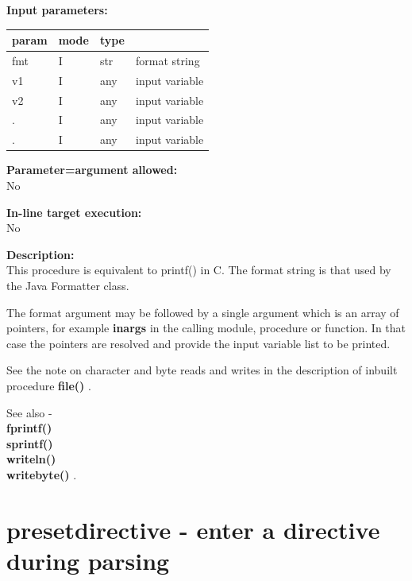         {\bf Input parameters:} \\
        \begin{tabular}{| l | l | l | l |}
        \hline
        param  & mode     & type  & \\
        \hline \hline
        fmt & I & str & format string   \\ \hline
        v1  & I & any & input variable  \\ \hline
        v2  & I & any & input variable  \\ \hline
        .   & I & any & input variable  \\ \hline
        .   & I & any & input variable  \\ \hline
        \end{tabular}
        
        {\bf Parameter=argument allowed:} \\
        No
        
        {\bf In-line target execution:} \\
        No
        
        {\bf Description:} \\
        This procedure is equivalent to printf() in C. The format string is that used
        by the Java Formatter class.
        
        The format argument may be followed by a single argument which is an array of
        pointers, for example {\bf inargs} in the calling module, procedure or function.
        In that case the pointers are resolved and provide the input variable list to be
        printed.
             
        See the note on character and byte reads and writes in the description
        of inbuilt procedure {\bf file()} .
   
        See also - \\
        {\bf fprintf()}  \\
        {\bf sprintf()}  \\
        {\bf writeln()}  \\
        {\bf writebyte()} .




    \section{presetdirective - enter a directive during parsing}\label{sec:ippresetdirective}
        
